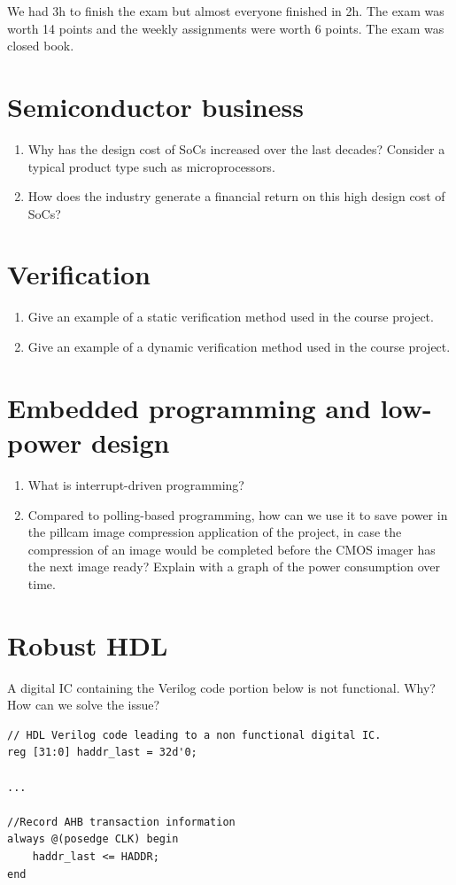 \documentclass[fr]{sourcefiles/eplexam} %
\begin{document}
\noindent We had 3h to finish the exam but almost everyone finished in 2h. The exam was worth 14 points and the weekly assignments were worth 6 points. The exam was closed book.

\section{Semiconductor business}
\begin{enumerate}
    \item Why has the design cost of SoCs increased over the last decades? Consider a typical product type such as microprocessors.
    \item  How does the industry generate a financial return on this high design cost of SoCs?
\end{enumerate}
\nosolution


\section{Verification}
\begin{enumerate}
    \item  Give an example of a static verification method used in the course project.
    \item Give an example of a dynamic verification method used in the course project.
\end{enumerate}
\nosolution



\section{Embedded programming and low-power design}
\begin{enumerate}
    \item What is interrupt-driven programming?
    \item Compared to polling-based programming, how can we use it to save power in the pillcam image compression application of the project, in case the compression of an image would be completed before the CMOS imager has the next image ready? Explain with a graph of the power consumption over time.
\end{enumerate}
\nosolution

\section{Robust HDL}
\noindent A digital IC containing the Verilog code portion below is not functional. Why? How can we solve the issue?
\begin{lstlisting}[style={verilog-style}]
// HDL Verilog code leading to a non functional digital IC.
reg [31:0] haddr_last = 32d'0;

...

//Record AHB transaction information
always @(posedge CLK) begin
    haddr_last <= HADDR;
end
\end{lstlisting}
\end{document}
